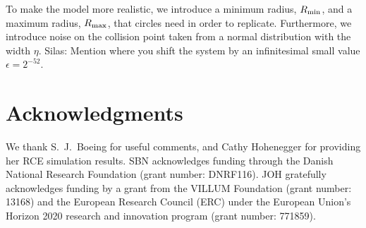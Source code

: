\documentclass[reprint,amsmath,amssymb]{revtex4-1}
\begin{document}
To make the model more realistic, we introduce a minimum radius, $R_{\textnormal{min}}$, and a maximum radius, $R_{\textnormal{max}}$, that circles need in order to replicate. Furthermore, we introduce noise on the collision point taken from a normal distribution with the width $\eta$. {\color{red} Silas: Mention where you shift the system by an infinitesimal small value $\epsilon=2^{-52}$.}

\section*{Acknowledgments}\label{sec:acknowledgments}
We thank S.~J.~Boeing for useful comments, and Cathy Hohenegger for providing her RCE simulation results.
SBN acknowledges funding through the Danish National Research Foundation (grant number: DNRF116).
JOH gratefully acknowledges funding by a grant from the VILLUM Foundation (grant number: 13168) and the European Research Council (ERC) under the European Union's Horizon 2020 research and innovation program (grant number: 771859).



\setcounter{figure}{0} 
\renewcommand{\thefigure}{S\arabic{figure}}
\end{document}

